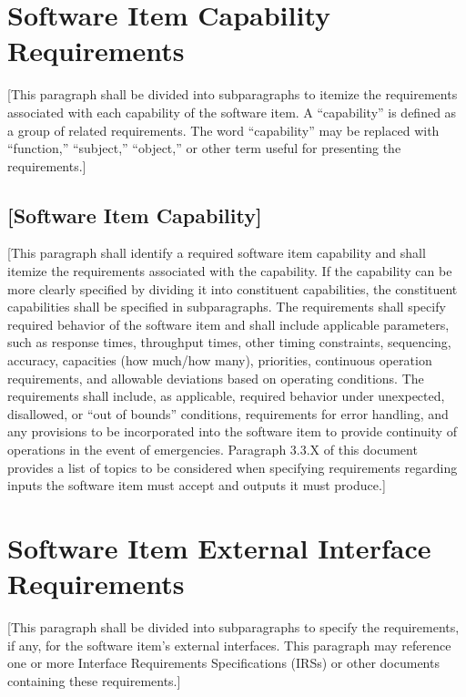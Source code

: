 \section{Software Item Capability Requirements\label{ref-007}}

[This paragraph shall be divided into subparagraphs to itemize the requirements associated with each capability of the software item. A ``capability'' is defined as a group of related requirements. The word ``capability'' may be replaced with ``function,'' ``subject,'' ``object,'' or other term useful for presenting the requirements.]

\subsection{[Software Item Capability]\label{ref-008}}

[This paragraph shall identify a required software item capability and shall itemize the requirements associated with the capability. If the capability can be more clearly specified by dividing it into constituent capabilities, the constituent capabilities shall be specified in subparagraphs. The requirements shall specify required behavior of the software item and shall include applicable parameters, such as response times, throughput times, other timing constraints, sequencing, accuracy, capacities (how much/how many), priorities, continuous operation requirements, and allowable deviations based on operating conditions. The requirements shall include, as applicable, required behavior under unexpected, disallowed, or ``out of bounds'' conditions, requirements for error handling, and any provisions to be incorporated into the software item to provide continuity of operations in the event of emergencies. Paragraph 3.3.X of this document provides a list of topics to be considered when specifying requirements regarding inputs the software item must accept and outputs it must produce.]

\section{Software Item External Interface Requirements\label{ref-009}}

[This paragraph shall be divided into subparagraphs to specify the requirements, if any, for the software item's external interfaces. This paragraph may reference one or more Interface Requirements Specifications (IRSs) or other documents containing these requirements.]

